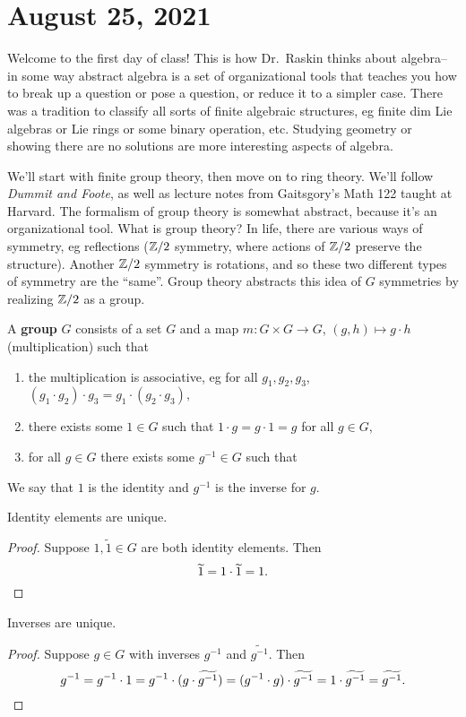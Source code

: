 \section{August 25, 2021}
Welcome to the first day of class! This is how Dr.\ Raskin thinks about algebra-- in some way abstract algebra is a set of organizational tools that teaches you how to break up a question or pose a question, or reduce it to a simpler case. There was a tradition to classify all sorts of finite algebraic structures, eg finite dim Lie algebras or Lie rings or some binary operation, etc. Studying geometry or showing there are no solutions are more interesting aspects of algebra.

We'll start with finite group theory, then move on to ring theory. We'll follow \emph{Dummit and Foote}, as well as lecture notes from Gaitsgory's Math 122 taught at Harvard. The formalism of group theory is somewhat abstract, because it's an organizational tool. What is group theory? In life, there are various ways of symmetry, eg reflections ($\mathbb{Z} /2$ symmetry, where actions of $\mathbb{Z} /2$ preserve the structure). Another $\mathbb{Z} /2$ symmetry is rotations, and so these two different types of symmetry are the ``same''. Group theory abstracts this idea of $G$ symmetries by realizing $\mathbb{Z} /2$ as a group.

\begin{definition}[]
    A \textbf{group} $G$ consists of a set $G$ and a map $m \colon G \times G \to G$, $(g,h) \mapsto g\cdot h$ (multiplication) such that
    \begin{enumerate}[label=(\alph*)]
    \setlength\itemsep{-.2em}
        \item the multiplication is associative, eg for all $g_1,g_2,g_3$, $(g_1 \cdot g_2) \cdot g_3= g_1 \cdot (g_2 \cdot g_3),$ 
    \item there exists some $1 \in G$ such that $1 \cdot g =g \cdot 1=g$ for all $g \in G$, 
    \item for all $g \in G$ there exists some $g ^{-1} \in G$ such that 
    \end{enumerate}
    We say that $1$ is the identity and $g^{-1}$ is the inverse for $g$.
\end{definition}
\begin{lemma}
    Identity elements are unique.
\end{lemma}
\begin{proof}
    Suppose $1, \widetilde 1\in G$ are both identity elements. Then \[
    \widetilde 1= 1 \cdot \widetilde 1=1.\qedhere
    \] 
\end{proof}
\begin{lemma}
    Inverses are unique.
\end{lemma}
\begin{proof}
    Suppose $g \in G$ with inverses $g ^{-1}$ and $\widetilde{g ^{-1}} $. Then \[
        g^{-1} = g^{-1} \cdot 1=g^{-1}\cdot (g \cdot \widetilde {g^{-1}} )=(g^{-1} \cdot g) \cdot \widetilde {g^{-1}} =1 \cdot \widetilde {g^{-1}} =\widetilde {g^{-1}} .\qedhere
    \] 
\end{proof}

